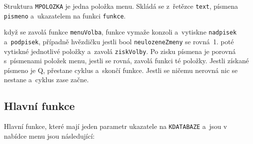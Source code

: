Struktura \texttt{MPOLOZKA} je jedna položka menu. Skládá se z~řetězce \texttt{text}, písmena \texttt{pismeno} a~ukazatelem 
na funkci \texttt{funkce}. 

když se zavolá funkce \texttt{menuVolba}, funkce vymaže konzoli a~vytiskne \texttt{nadpisek} a~\texttt{podpisek}, případně 
hvězdičku jestli bool \texttt{neulozeneZmeny} se rovná~1. poté vytiskné jednotlivé položky a~zavolá \texttt{ziskVolby}. 
Po zisku písmena je porovná s~písmenami položek menu, jestli se rovná, zavolá funkci té položky. Jestli získané 
písmeno je Q, přestane cyklus a~skončí funkce. Jestli se ničemu nerovná nic se nestane a~cyklus zase začne. 

\subsection{Hlavní funkce}
Hlavní funkce, které mají jeden parametr ukazatele na \texttt{KDATABAZE} a~jsou v nabídce menu jsou následující:

